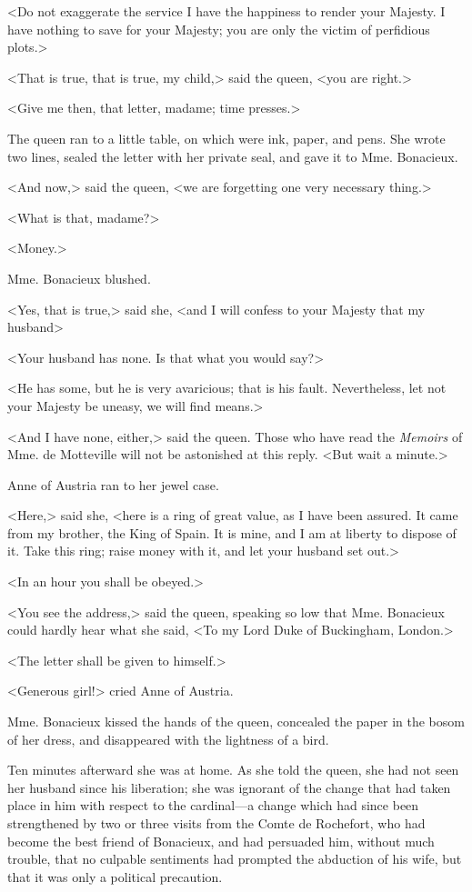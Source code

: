 <Do not exaggerate the service I have the happiness to render your Majesty. I have nothing to save for your Majesty; you are only the victim of perfidious plots.> 

<That is true, that is true, my child,> said the queen, <you are right.> 

<Give me then, that letter, madame; time presses.> 

The queen ran to a little table, on which were ink, paper, and pens. She wrote two lines, sealed the letter with her private seal, and gave it to Mme. Bonacieux. 

<And now,> said the queen, <we are forgetting one very necessary thing.> 

<What is that, madame?> 

<Money.> 

Mme. Bonacieux blushed. 

<Yes, that is true,> said she, <and I will confess to your Majesty that my husband\longdash> 

<Your husband has none. Is that what you would say?> 

<He has some, but he is very avaricious; that is his fault. Nevertheless, let not your Majesty be uneasy, we will find means.> 

<And I have none, either,> said the queen. Those who have read the \textit{Memoirs} of Mme. de Motteville will not be astonished at this reply. <But wait a minute.> 

Anne of Austria ran to her jewel case. 

<Here,> said she, <here is a ring of great value, as I have been assured. It came from my brother, the King of Spain. It is mine, and I am at liberty to dispose of it. Take this ring; raise money with it, and let your husband set out.> 

<In an hour you shall be obeyed.> 

<You see the address,> said the queen, speaking so low that Mme. Bonacieux could hardly hear what she said, <To my Lord Duke of Buckingham, London.> 

<The letter shall be given to himself.> 

<Generous girl!> cried Anne of Austria. 

Mme. Bonacieux kissed the hands of the queen, concealed the paper in the bosom of her dress, and disappeared with the lightness of a bird. 

Ten minutes afterward she was at home. As she told the queen, she had not seen her husband since his liberation; she was ignorant of the change that had taken place in him with respect to the cardinal---a change which had since been strengthened by two or three visits from the Comte de Rochefort, who had become the best friend of Bonacieux, and had persuaded him, without much trouble, that no culpable sentiments had prompted the abduction of his wife, but that it was only a political precaution. 

